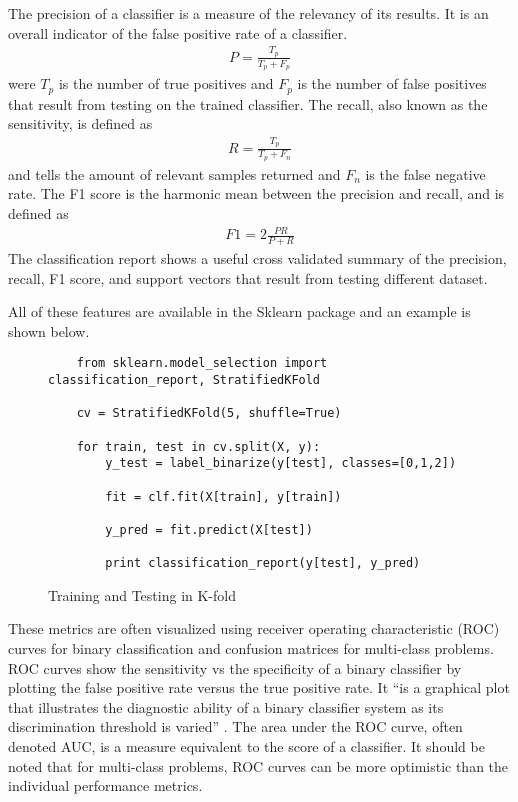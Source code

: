 The precision of a classifier is a measure of the relevancy of its results.  It is an overall indicator of the false positive rate of a classifier.
%
\begin{align}
    P = \frac{T_p}{T_p + F_p}
\end{align}
%
were $T_p$ is the number of true positives and $F_p$ is the number of false positives that result from testing on the trained classifier.  The recall, also known as the sensitivity, is defined as
%
\begin{align}
    R = \frac{T_p}{T_p + F_n}
\end{align}
%
and tells the amount of relevant samples returned and $F_n$ is the false negative rate.  The F1 score is the harmonic mean between the precision and recall, and is defined as
%
\begin{align}
    F1 = 2\frac{PR}{P + R}
\end{align}
%
The classification report shows a useful cross validated summary of the precision, recall, F1 score, and support vectors that result from testing different dataset.

All of these features are available in the Sklearn package and an example is shown below.
%

%
\begin{figure}
    \begin{lstlisting}
    from sklearn.model_selection import classification_report, StratifiedKFold

    cv = StratifiedKFold(5, shuffle=True)

    for train, test in cv.split(X, y):
        y_test = label_binarize(y[test], classes=[0,1,2])

        fit = clf.fit(X[train], y[train])

        y_pred = fit.predict(X[test])

        print classification_report(y[test], y_pred)
    \end{lstlisting}
    \caption{Training and Testing in K-fold}
    \label{fig:scattering}
\end{figure}
These metrics are often visualized using receiver operating characteristic (ROC) curves for binary classification and confusion matrices for multi-class problems.  ROC curves show the sensitivity vs the specificity of a binary classifier by plotting the false positive rate versus the true positive rate.  It “is a graphical plot that illustrates the diagnostic ability of a binary classifier system as its discrimination threshold is varied” \cite{wikiroc}. The area under the ROC curve, often denoted AUC, is a measure equivalent to the score of a classifier. It should be noted that for multi-class problems, ROC curves can be more optimistic than the individual performance metrics.

